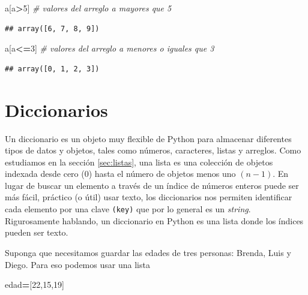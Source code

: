 \documentclass[
]{book}
\newenvironment{Shaded}{\begin{snugshade}}{\end{snugshade}}
\newcommand{\CommentTok}[1]{\textcolor[rgb]{0.56,0.35,0.01}{\textit{#1}}}
\newcommand{\DecValTok}[1]{\textcolor[rgb]{0.00,0.00,0.81}{#1}}
\newcommand{\NormalTok}[1]{#1}
\newcommand{\OperatorTok}[1]{\textcolor[rgb]{0.81,0.36,0.00}{\textbf{#1}}}
\theoremstyle{definition}
\theoremstyle{definition}
\theoremstyle{definition}
\theoremstyle{definition}
\theoremstyle{remark}
\begin{document}
\begin{Shaded}
\begin{Highlighting}[]
\NormalTok{a[a}\OperatorTok{\textgreater{}}\DecValTok{5}\NormalTok{] }\CommentTok{\# valores del arreglo a mayores que 5  }
\end{Highlighting}
\end{Shaded}

\begin{verbatim}
## array([6, 7, 8, 9])
\end{verbatim}

\begin{Shaded}
\begin{Highlighting}[]
\NormalTok{a[a}\OperatorTok{\textless{}=}\DecValTok{3}\NormalTok{] }\CommentTok{\# valores del arreglo a menores o iguales que 3}
\end{Highlighting}
\end{Shaded}

\begin{verbatim}
## array([0, 1, 2, 3])
\end{verbatim}

\hypertarget{diccionarios}{%
\section{Diccionarios}\label{diccionarios}}

Un diccionario es un objeto muy flexible de Python para almacenar diferentes tipos de datos y objetos, tales como números, caracteres, listas y arreglos. Como estudiamos en la sección \ref{sec:listas}, una lista es una colección de objetos indexada desde cero (0) hasta el número de objetos menos uno \((n-1)\). En lugar de buscar un elemento a través de un índice de números enteros puede ser más fácil, práctico (o útil) usar texto, los diccionarios nos permiten identificar cada elemento por una clave \texttt{(key)} que por lo general es un \emph{string}. Rigurosamente hablando, un diccionario en Python es una lista donde los índices pueden ser texto.

Suponga que necesitamos guardar las edades de tres personas: Brenda, Luis y Diego. Para eso podemos usar una lista

\begin{Shaded}
\begin{Highlighting}[]
\NormalTok{edad}\OperatorTok{=}\NormalTok{[}\DecValTok{22}\NormalTok{,}\DecValTok{15}\NormalTok{,}\DecValTok{19}\NormalTok{]  }
\end{Highlighting}
\end{Shaded}
\end{document}
